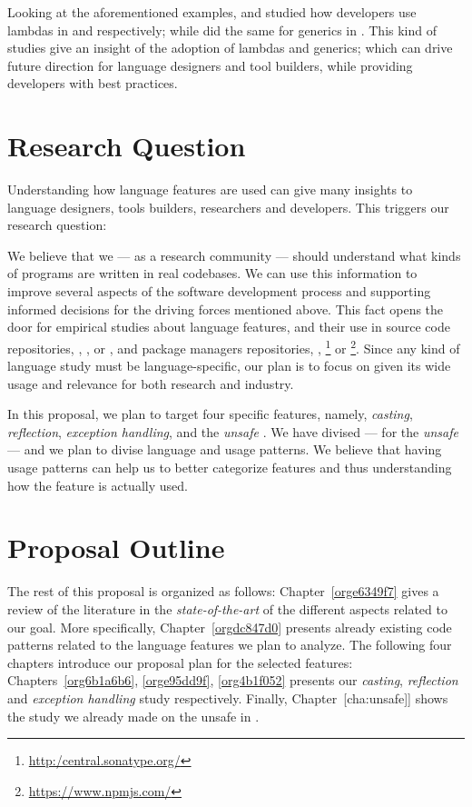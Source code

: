 \documentclass{usiinfdocprop}
\begin{document}
Looking at the aforementioned examples, \cite{mazinanian_understanding_2017} and \cite{uesbeck_empirical_2016} studied how developers use lambdas in \java{} and \cpp{} respectively; while \cite{parnin_java_2011,parnin_adoption_2013} did the same for generics in \java{}.
This kind of studies give an insight of the adoption of lambdas and generics; which can drive future direction for language designers and tool builders, while providing developers with best practices.

\section{Research Question}
\label{sec:orgf688833}
Understanding how language features are used can give many insights to language designers, tools builders, researchers and developers.
This triggers our research question:


We believe that we --- as a research community --- should understand what kinds of programs are written in real codebases.
We can use this information to improve several aspects of the software development process and supporting informed decisions for the driving forces mentioned above.
This fact opens the door for empirical studies about language features, and their use in source code repositories, \eg{}, \github{}, \gitlab{} or \bitbucket{}, and package managers repositories, \eg{}, \mavencentral \footnote{\url{http:/central.sonatype.org/}} or \npm \footnote{\url{https://www.npmjs.com/}}. 
Since any kind of language study must be language-specific, our plan is to focus on \java{} given its wide usage and relevance for both research and industry.

In this proposal, we plan to target four specific \java{} features, namely, \emph{casting}, \emph{reflection}, \emph{exception handling}, and the \emph{unsafe \api{}}.
We have divised --- for the \emph{unsafe \api{}} --- and we plan to divise language and \api{} usage patterns.
We believe that having usage patterns can help us to better categorize features and thus understanding how the feature is actually used.

\section{Proposal Outline}
\label{sec:org4fc7549}
The rest of this proposal is organized as follows:
Chapter~\ref{orge6349f7} gives a review of the literature in the \emph{state-of-the-art} of the different aspects related to our goal.
More specifically, Chapter~\ref{orgdc847d0} presents already existing code patterns related to the language features we plan to analyze.
The following four chapters introduce our proposal plan for the selected features:
Chapters~\ref{org6b1a6b6}, \ref{orge95dd9f}, \ref{org4b1f052} presents our \emph{casting}, \emph{reflection} and \emph{exception handling} study respectively.
Finally, Chapter~[cha:unsafe]] shows the study we already made on the unsafe \api{} in \java{}.
\end{document}

